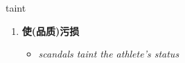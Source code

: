 
\begin{frame}
{\huge taint}
\begin{center}
\begin{enumerate}\Large
  \item \textbf{使(品质)污损}
  \begin{itemize}
    \item \em{\Large{scandals taint the athlete's status}}
  \end{itemize}
\end{enumerate}
\end{center}
\end{frame}
